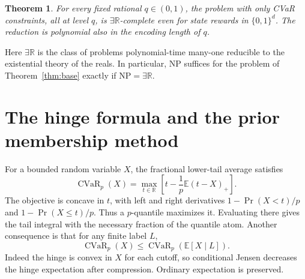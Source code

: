 \documentclass[11pt,a4paper]{amsart}
\newtheorem{theorem}{Theorem}
\newcommand{\RR}{\exists\mathbb R}
\newcommand{\CV}{\operatorname{CVaR}}
\begin{document}
\begin{theorem}\label{thm:pure}
For every fixed rational \(q\in(0,1)\), the problem with only CVaR constraints, all at level \(q\), is \(\RR\)-complete even for state rewards in \(\{0,1\}^d\). The reduction is polynomial also in the encoding length of \(q\).
\end{theorem}

Here \(\RR\) is the class of problems polynomial-time many-one reducible to the existential theory of the reals. In particular, NP suffices for the problem of Theorem~\ref{thm:base} exactly if \(\mathrm{NP}=\RR\).

\section{The hinge formula and the prior membership method}

For a bounded random variable \(X\), the fractional lower-tail average satisfies
\begin{equation}\label{eq:hinge}
 \CV_p(X)=\max_{t\in\mathbb R}\left[t-\frac1p\mathbb E(t-X)_+\right].
\end{equation}
The objective is concave in \(t\), with left and right derivatives \(1-\Pr(X<t)/p\) and \(1-\Pr(X\le t)/p\). Thus a \(p\)-quantile maximizes it. Evaluating there gives the tail integral with the necessary fraction of the quantile atom. Another consequence is that for any finite label \(L\),
\begin{equation}\label{eq:jensen}
 \CV_p(X)\le\CV_p(\mathbb E[X\mid L]).
\end{equation}
Indeed the hinge is convex in \(X\) for each cutoff, so conditional Jensen decreases the hinge expectation after compression. Ordinary expectation is preserved.
\end{document}
